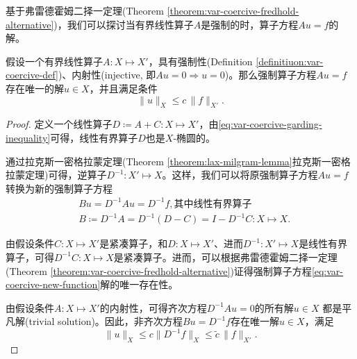 基于弗雷德霍姆二择一定理(Theorem \ref{theorem:var-coercive-fredhold-alternative})，我们可以探讨当有界线性算子$A$是强制的时，算子方程$A u = f$的解。
\begin{theorem}[强制算子方程的解]
  假设一个有界线性算子$A: X \mapsto X'$，具有强制性(Definition \ref{definitiuon:var-coercive-def})、内射性(injective, 即$A u = 0 \Rightarrow u = 0$)。那么强制算子方程$A u = f$存在唯一的解$u \in X$，并且满足条件
  \begin{equation*}
    \big\| u \big\|_{X} \le c \, \big\| f \big\|_{X'}.
  \end{equation*}
\end{theorem}
\begin{proof}
  定义一个线性算子$D \coloneqq A + C: X \mapsto X'$，由\eqref{eq:var-coercive-garding-inequality}可得，线性有界算子$D$也是$X$-椭圆的。

  通过拉克斯一密格拉蒙定理(Theorem \ref{theorem:lax-milgram-lemma}拉克斯一密格拉蒙定理)可得，逆算子$D^{-1}: X' \mapsto X$。这样，我们可以将原强制算子方程$Au = f$转换为新的强制算子方程
  \begin{equation}
    \label{eq:var-coercive-new-function}
    \begin{split}
      &B u = D^{-1} A u = D^{-1} f, \text{其中线性有界算子}\\
      &B \coloneqq D^{-1} A = D^{-1} \left( D - C \right) = I - D^{-1} C: X \mapsto X.
    \end{split}
  \end{equation}

  由假设条件$C:X \mapsto X'$是紧凑算子，和$D:X \mapsto X'$、进而$D^{-1}:X' \mapsto X$是线性有界算子，可得$D^{-1} C:X \mapsto X$是紧凑算子。进而，可以根据弗雷德霍姆二择一定理(Theorem \ref{theorem:var-coercive-fredhold-alternative})证得强制算子方程\eqref{eq:var-coercive-new-function}解的唯一存在性。

  由假设条件$A:X \mapsto X'$的内射性，可得齐次方程$D^{-1} A u =0$的所有解$u \in X$ 都是平凡解(trivial solution)。因此，非齐次方程$B u = D^{-1} f$存在唯一解$u \in X$，满足
  \begin{equation*}
    \big\| u \big\|_{X} \le c \big\| D^{-1} f \big\|_{X} \le \tilde{c} \, \big\| f \big\|_{X'}.
  \end{equation*}
\end{proof}
